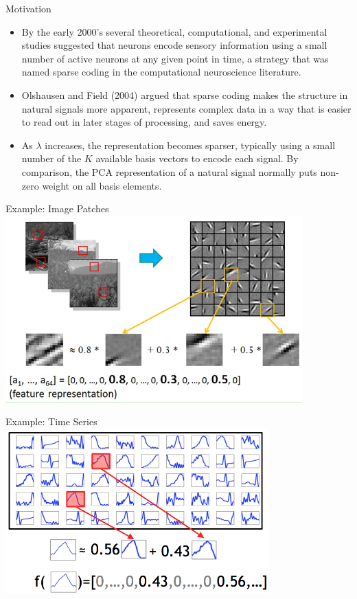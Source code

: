 \documentclass[serif,xcolor=pdftex,dvipsnames,table,hyperref={bookmarks=false,breaklinks}]{beamer}
\begin{document}
\begin{frame}[t]{Motivation}

\begin{itemize}
\item By the early 2000's several theoretical, computational, and experimental 
studies suggested that neurons encode sensory information using a small
number of active neurons at any given point in time, a strategy that was named
sparse coding in the computational neuroscience literature.

\pause\item Olshausen and Field (2004) argued that sparse coding makes 
the structure in natural signals more apparent, represents complex data in a 
way that is easier to read out in later stages of processing, and saves energy.

\pause\item As $\lambda$ increases, the representation becomes sparser, 
typically using a small number of the $K$ available basis vectors to encode 
each signal. By comparison, the PCA representation of a natural signal normally 
puts non-zero weight on all basis elements.

\end{itemize}
\end{frame}

\begin{frame}[t]{Example: Image Patches}
\center
\includegraphics[width=4.5in]{../Figures/sparse_coding_images.jpg}
\end{frame}

\begin{frame}[t]{Example: Time Series}
\center
\includegraphics[width=4in]{../Figures/spase_coding_time_series.png}
\end{frame}
\end{document}
